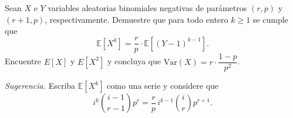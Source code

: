 \documentclass[12pt,a4paper]{article}
\begin{document}
    \begin{mdframed}[style=mdpinkbox, frametitle={Ejercicio 5}]
        Sean $X$ e $Y$ variables aleatorias binomiales negativas de parámetros $(r, p)$ y $(r+1, p)$,
        respectivamente. Demuestre que para todo entero $k \geq 1$ se cumple que
        \begin{equation*}
            \mathbb{E}[X^k] = \frac{r}{p} \cdot \mathbb{E}[(Y-1)^{k-1}].
        \end{equation*}
        Encuentre $E[X]$ y $E[X^2]$ y concluya que $\mathrm{Var}(X) = r \cdot \dfrac{1-p}{p^2}$.

        \medskip
        \noindent\textit{Sugerencia.} Escriba $\mathbb{E}[X^k]$ como una serie y considere que
        \begin{equation*}
            i^k \binom{i-1}{r-1} p^r = \frac{r}{p}\, i^{k-1} \binom{i}{r} p^{r+1}.
        \end{equation*}
    \end{mdframed}
\end{document}
